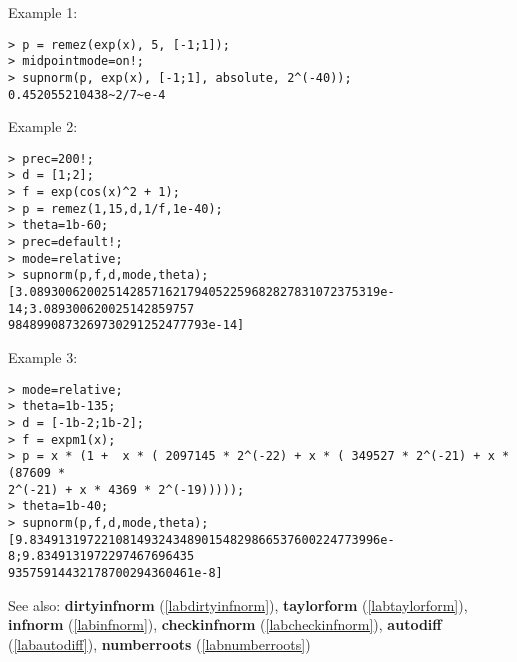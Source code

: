 \noindent Example 1: 
\begin{center}\begin{minipage}{15cm}\begin{Verbatim}[frame=single]
> p = remez(exp(x), 5, [-1;1]);
> midpointmode=on!;
> supnorm(p, exp(x), [-1;1], absolute, 2^(-40));
0.452055210438~2/7~e-4
\end{Verbatim}
\end{minipage}\end{center}
\noindent Example 2: 
\begin{center}\begin{minipage}{15cm}\begin{Verbatim}[frame=single]
> prec=200!;
> d = [1;2];
> f = exp(cos(x)^2 + 1);
> p = remez(1,15,d,1/f,1e-40);
> theta=1b-60;
> prec=default!;
> mode=relative;
> supnorm(p,f,d,mode,theta);
[3.0893006200251428571621794052259682827831072375319e-14;3.089300620025142859757
9848990873269730291252477793e-14]
\end{Verbatim}
\end{minipage}\end{center}
\noindent Example 3: 
\begin{center}\begin{minipage}{15cm}\begin{Verbatim}[frame=single]
> mode=relative;
> theta=1b-135;
> d = [-1b-2;1b-2];
> f = expm1(x);
> p = x * (1 +  x * ( 2097145 * 2^(-22) + x * ( 349527 * 2^(-21) + x * (87609 * 
2^(-21) + x * 4369 * 2^(-19))))); 
> theta=1b-40;
> supnorm(p,f,d,mode,theta);
[9.8349131972210814932434890154829866537600224773996e-8;9.8349131972297467696435
93575914432178700294360461e-8]
\end{Verbatim}
\end{minipage}\end{center}
See also: \textbf{dirtyinfnorm} (\ref{labdirtyinfnorm}), \textbf{taylorform} (\ref{labtaylorform}), \textbf{infnorm} (\ref{labinfnorm}), \textbf{checkinfnorm} (\ref{labcheckinfnorm}), \textbf{autodiff} (\ref{labautodiff}), \textbf{numberroots} (\ref{labnumberroots})
